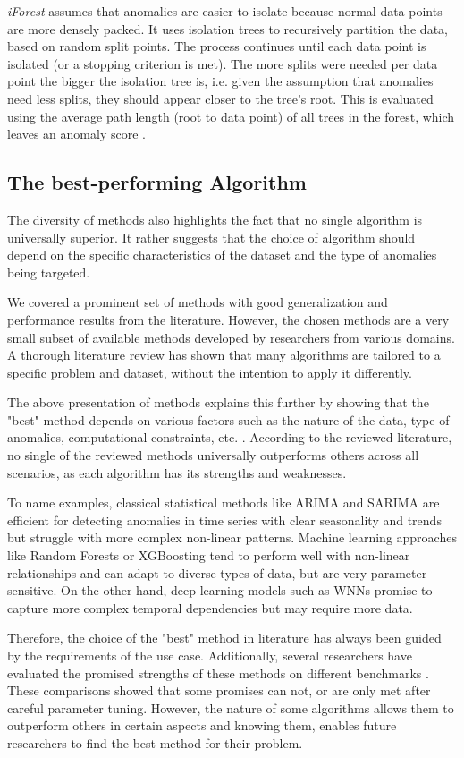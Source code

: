 \textit{iForest} assumes that anomalies are easier to isolate because normal data points are more densely packed. It uses isolation trees to recursively partition the data, based on random split points. The process continues until each data point is isolated (or a stopping criterion is met). The more splits were needed per data point the bigger the isolation tree is, i.e. given the assumption that anomalies need less splits, they should appear closer to the tree's root. This is evaluated using the average path length (root to data point) of all trees in the forest, which leaves an anomaly score \cite{Sub-IF}.

\subsection{The best-performing Algorithm}
The diversity of methods also highlights the fact that no single algorithm is universally superior. It rather suggests that the choice of algorithm should depend on the specific characteristics of the dataset and the type of anomalies being targeted. 

We covered a prominent set of methods with good generalization and performance results from the literature. However, the chosen methods are a very small subset of available methods developed by researchers from various domains. A thorough literature review has shown that many algorithms are tailored to a specific problem and dataset, without the intention to apply it differently. 

The above presentation of methods explains this further by showing that the "best" method depends on various factors such as the nature of the data, type of anomalies, computational constraints, etc. \cite{Schmidl2022}. According to the reviewed literature, no single of the reviewed methods universally outperforms others across all scenarios, as each algorithm has its strengths and weaknesses.

To name examples, classical statistical methods like ARIMA and SARIMA are efficient for detecting anomalies in time series with clear seasonality and trends but struggle with more complex non-linear patterns. Machine learning approaches like Random Forests or XGBoosting tend to perform well with non-linear relationships and can adapt to diverse types of data, but are very parameter sensitive. On the other hand, deep learning models such as WNNs promise to capture more complex temporal dependencies but may require more data. 

Therefore, the choice of the "best" method in literature has always been guided by the requirements of the use case. Additionally, several researchers have evaluated the promised strengths of these methods on different benchmarks \cite{Schmidl2022, Braei2020, BlazquezGarcia2021, Chandola2009}. These comparisons showed that some promises can not, or are only met after careful parameter tuning. However, the nature of some algorithms allows them to outperform others in certain aspects and knowing them, enables future researchers to find the best method for their problem.



